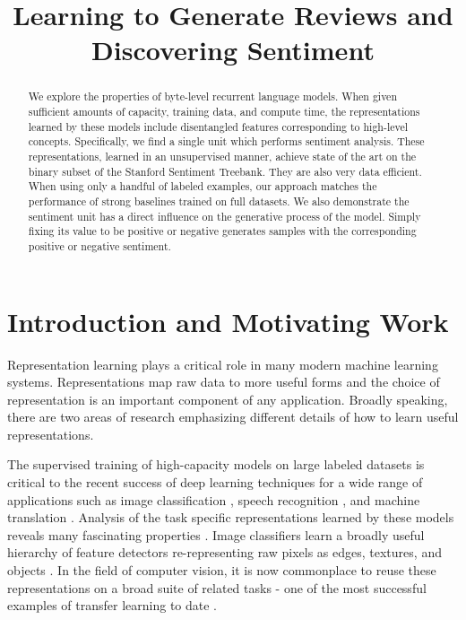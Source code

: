 \title{Learning to Generate Reviews and Discovering Sentiment}

\begin{abstract}
We explore the properties of byte-level recurrent language models. When given sufficient amounts of capacity, training data, and compute time, the representations learned by these models include disentangled features corresponding to high-level concepts. Specifically, we find a single unit which performs sentiment analysis. These representations, learned in an unsupervised manner, achieve state of the art on the binary subset of the Stanford Sentiment Treebank. They are also very data efficient. When using only a handful of labeled examples, our approach matches the performance of strong baselines trained on full datasets. We also demonstrate the sentiment unit has a direct influence on the generative process of the model. Simply fixing its value to be positive or negative generates samples with the corresponding positive or negative sentiment.
\end{abstract}

\section{Introduction and Motivating Work} Representation learning \cite{bengio2013representation} plays a critical role in many modern machine learning systems. Representations map raw data to more useful forms and the choice of representation is an important component of any application. Broadly speaking, there are two areas of research emphasizing different details of how to learn useful representations. 

The supervised training of high-capacity models on large labeled datasets is critical to the recent success of deep learning techniques for a wide range of applications such as image classification \cite{krizhevsky2012imagenet}, speech recognition \cite{hinton2012deep}, and machine translation \cite{wu2016google}. Analysis of the task specific representations learned by these models reveals many fascinating properties \cite{zhou2014object}. Image classifiers learn a broadly useful hierarchy of feature detectors re-representing raw pixels as edges, textures, and objects \cite{zeiler2014visualizing}. In the field of computer vision, it is now commonplace to reuse these representations on a broad suite of related tasks - one of the most successful examples of transfer learning to date \cite{oquab2014learning}.


